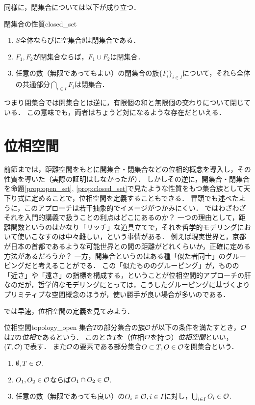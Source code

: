\documentclass[11pt,a4paper, dvipdfmx]{jsarticle}
\begin{document}
同様に，閉集合については以下が成り立つ．

\begin{prop}{閉集合の性質}{closed_set}
  \begin{enumerate}
   \item $S$全体ならびに空集合$\emptyset$は閉集合である．
   \item $F_1, F_2$が閉集合ならば，$F_1 \cup F_2$は閉集合．
   \item 任意の数（無限であってもよい）の閉集合の族$\{ F_i \}_{i \in I}$について，それら全体の共通部分$\bigcap_{i \in I} F_i$は閉集合．
  \end{enumerate}
  \end{prop}
  つまり閉集合では開集合とは逆に，有限個の和と無限個の交わりについて閉じている．
  この意味でも，両者はちょうど対になるような存在だといえる．





\section{位相空間}

前節までは，距離空間をもとに開集合・閉集合などの位相的概念を導入し，その性質を導いた（実際の証明はしなかったが）．
しかしその逆に，開集合・閉集合を命題\ref{prop:open_set}, \ref{prop:closed_set}で見たような性質をもつ集合族として天下り式に定めることで，位相空間を定義することもできる．
冒頭でも述べたように，このアプローチは若干抽象的でイメージがつかみにくい．
ではわざわざそれを入門的講義で扱うことの利点はどこにあるのか？
一つの理由として，距離関数というのはかなり「リッチ」な道具立てで，それを哲学的モデリングにおいて使いこなすのは中々難しい，という事情がある．
例えば現実世界と，京都が日本の首都であるような可能世界との間の距離がどれくらいか，正確に定める方法があるだろうか？
一方，開集合というのはある種「似た者同士」のグルーピングだと考えることがでる．
この「似たもののグルーピング」が，ものの「近さ」や「遠さ」の指標を構成する，ということが位相空間的アプローチの肝なのだが，哲学的なモデリングにとっては，こうしたグルーピングに基づくよりプリミティブな空間概念のほうが，使い勝手が良い場合が多いのである．

では早速，位相空間の定義を見てみよう．

\begin{dfn}{位相空間}{topology_open}
集合$T$の部分集合の族$\mathcal{O}$が以下の条件を満たすとき，$\mathcal{O}$は$T$の\emph{位相}であるという．
このとき$T$を（位相$\mathcal{O}$を持つ）\emph{位相空間}といい，$(T, \mathcal{O})$で表す．
また$\mathcal{O}$の要素である部分集合$O \subset T, O \in \mathcal{O}$を開集合という．
\begin{enumerate}
 \item $\emptyset, T \in \mathcal{O}$.
 \item $O_1, O_2 \in \mathcal{O}$ならば$O_1 \cap O_2 \in \mathcal{O}$.
 \item 任意の数（無限であっても良い）の$O_i \in \mathcal{O}, i \in I$に対し，$\bigcup_{i \in I} O_i \in \mathcal{O}$.
\end{enumerate}
\end{dfn}
\end{document}
